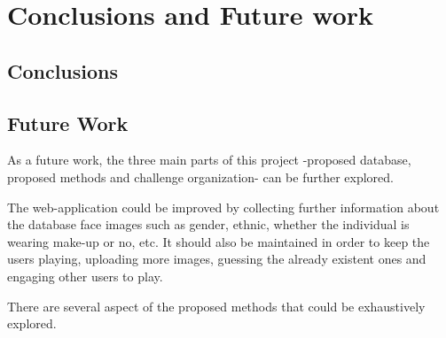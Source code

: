 \chapter{Conclusions and Future work} \label{chap:conclusions}

\section{Conclusions}



\section{Future Work}






As a future work, the three main parts of this project -proposed database, proposed methods and challenge organization- can be further explored.

The web-application could be improved by collecting further information about the database face images such as gender, ethnic, whether the individual is wearing make-up or no, etc. It should also be maintained in order to keep the users playing, uploading more images, guessing the already existent ones and engaging other users to play.

There are several aspect of the proposed methods that could be exhaustively explored.

